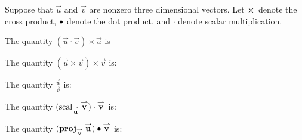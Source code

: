 \documentclass{ximera}
\author{Jim Talamo}
\begin{document}
\begin{exercise}
Suppose that $\vec u $ and $\vec v $ are nonzero three dimensional vectors.  Let $\boldsymbol\times$ denote the cross product, $\bullet$ denote the dot product, and $\cdot$ denote scalar multiplication.

The quantity $(\vec u \cdot \vec v) \times \vec u$ is

\begin{multipleChoice}
\end{multipleChoice}



The quantity $(\vec u \times \vec v)\times \vec v$ is:

\begin{multipleChoice}
\end{multipleChoice}

The quantity $\frac {\vec u} {\vec v}$ is:

\begin{multipleChoice}
\end{multipleChoice}

The quantity $(\operatorname{scal}_{{\overset{\boldsymbol{\rightharpoonup}}{\mathbf{u}}}} {\overset{\boldsymbol{\rightharpoonup}}{\mathbf{v}}}) \cdot {\overset{\boldsymbol{\rightharpoonup}}{\mathbf{v}}}$ is:
\begin{multipleChoice}
\end{multipleChoice}

The quantity $(\operatorname{\mathbf{proj}}_{{\overset{\boldsymbol{\rightharpoonup}}{\mathbf{v}}}} {\overset{\boldsymbol{\rightharpoonup}}{\mathbf{u}}})\bullet {\overset{\boldsymbol{\rightharpoonup}}{\mathbf{v}}}$ is:

\begin{multipleChoice}
\end{multipleChoice}



\end{exercise}
\end{document}
